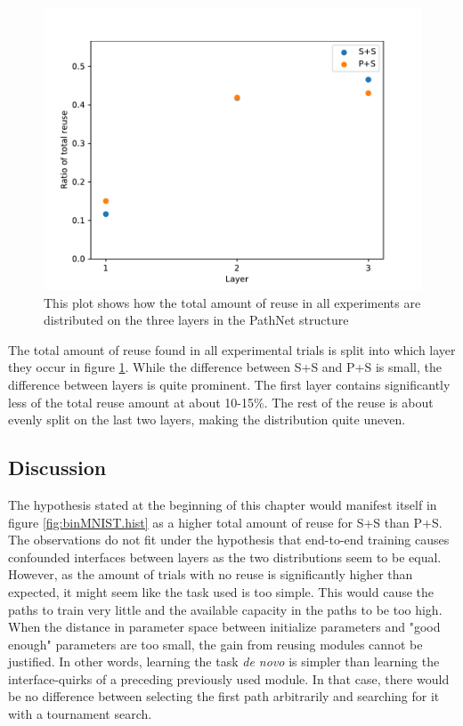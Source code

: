 \begin{figure}[t]
    \includegraphics[width=\textwidth]{Chapters/4.Experiments/exp1/figures/BIN_reuse_by_layer.pdf}
    \caption[Reuse by layer for binary MNIST classification]{This plot shows how the total amount of reuse in all experiments are distributed on the three layers in the PathNet structure }
    \label{fig:binMNIST.layer_reuse}
\end{figure}
 
The total amount of reuse found in all experimental trials is split into which layer they occur in figure \ref{fig:binMNIST.layer_reuse}. While the difference between S+S and P+S is small, the difference between layers is quite prominent. The first layer contains significantly less of the total reuse amount at about 10-15\%. The rest of the reuse is about evenly split on the last two layers, making the distribution quite uneven. 


\subsection{Discussion}
\label{exp1:BIN.discussion}
The hypothesis stated at the beginning of this chapter would manifest itself in figure \ref{fig:binMNIST.hist} as a higher total amount of reuse for S+S than P+S. The observations do not fit under the hypothesis that end-to-end training causes confounded interfaces between layers as the two distributions seem to be equal. However, as the amount of trials with no reuse is significantly higher than expected, it might seem like the task used is too simple. This would cause the paths to train very little and the available capacity in the paths to be too high. When the distance in parameter space between initialize parameters and "good enough" parameters are too small, the gain from reusing modules cannot be justified. In other words, learning the task \textit{de novo} is simpler than learning the interface-quirks of a preceding previously used module. In that case, there would be no difference between selecting the first path arbitrarily and searching for it with a tournament search. 


